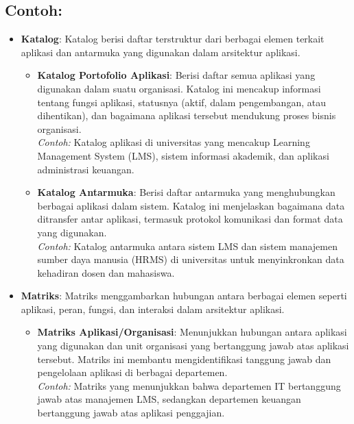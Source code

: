 \subsection*{Contoh:}

\begin{itemize}
	\item \textbf{Katalog}: Katalog berisi daftar terstruktur dari berbagai elemen terkait aplikasi dan antarmuka yang digunakan dalam arsitektur aplikasi.
	
	\begin{itemize}
		\item \textbf{Katalog Portofolio Aplikasi}: Berisi daftar semua aplikasi yang digunakan dalam suatu organisasi. Katalog ini mencakup informasi tentang fungsi aplikasi, statusnya (aktif, dalam pengembangan, atau dihentikan), dan bagaimana aplikasi tersebut mendukung proses bisnis organisasi. \\
		\textit{Contoh:} Katalog aplikasi di universitas yang mencakup Learning Management System (LMS), sistem informasi akademik, dan aplikasi administrasi keuangan.
		
		\item \textbf{Katalog Antarmuka}: Berisi daftar antarmuka yang menghubungkan berbagai aplikasi dalam sistem. Katalog ini menjelaskan bagaimana data ditransfer antar aplikasi, termasuk protokol komunikasi dan format data yang digunakan. \\
		\textit{Contoh:} Katalog antarmuka antara sistem LMS dan sistem manajemen sumber daya manusia (HRMS) di universitas untuk menyinkronkan data kehadiran dosen dan mahasiswa.
	\end{itemize}
	
	\item \textbf{Matriks}: Matriks menggambarkan hubungan antara berbagai elemen seperti aplikasi, peran, fungsi, dan interaksi dalam arsitektur aplikasi.
	
	\begin{itemize}
		\item \textbf{Matriks Aplikasi/Organisasi}: Menunjukkan hubungan antara aplikasi yang digunakan dan unit organisasi yang bertanggung jawab atas aplikasi tersebut. Matriks ini membantu mengidentifikasi tanggung jawab dan pengelolaan aplikasi di berbagai departemen. \\
		\textit{Contoh:} Matriks yang menunjukkan bahwa departemen IT bertanggung jawab atas manajemen LMS, sedangkan departemen keuangan bertanggung jawab atas aplikasi penggajian.
		

\end{itemize}
\end{itemize}
